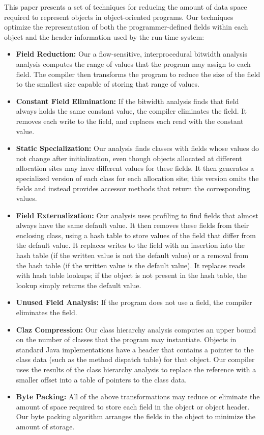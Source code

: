 \documentclass{acmconf}
\begin{document}
This paper presents a set of techniques for reducing the
amount of data space required to represent objects
in object-oriented programs. Our techniques optimize
the representation of both the programmer-defined fields
within each object and the header information used by the
run-time system:
\begin{itemize}
\item {\bf Field Reduction:} 
Our a flow-sensitive, interprocedural bitwidth analysis
analysis computes the range of values that the program
may assign to each field. The compiler then transforms the program
to reduce the size of the field to the smallest size 
capable of storing that range of values. 
\item {\bf Constant Field Elimination:} 
If the bitwidth analysis finds that field always holds
the same constant value, the compiler eliminates the field. 
It removes each write to the field, and replaces each read
with the constant value.
\item {\bf Static Specialization:} Our analysis finds 
classes with fields whose values do not change after initialization,
even though objects allocated at different allocation sites may
have different values for these fields. It then generates 
a specialized version of each class for each allocation site;
this version omits the fields and instead provides accessor
methods that return the corresponding values. 
\item {\bf Field Externalization:} Our analysis uses profiling
to find fields that almost always have the same default value. 
It then removes these fields from their enclosing class, 
using a hash table to store values of the field that differ
from the default value. It replaces writes to the field with
an insertion into the hash table (if the written value is not the
default value) or a removal from the hash table (if the written value
is the default value). It replaces reads with hash table lookups; 
if the object is not present in the hash table, the lookup simply
returns the default value. 
\item {\bf Unused Field Analysis:} If the program does not
use a field, the compiler eliminates the field. 
\item {\bf Claz Compression:} Our class hierarchy analysis
computes an upper bound on the number of classes that the
program may instantiate. Objects in standard 
Java implementations have a header that contains a pointer
to the class data (such as the method dispatch table) for that object. 
Our compiler uses the results of the class
hierarchy analysis to replace the reference with a smaller
offset into a table of pointers to the class data. 
\item {\bf Byte Packing:} All of the above transformations may
reduce or eliminate the amount of space required to store each
field in the object or object header. Our byte packing algorithm
arranges the fields in the object to minimize the amount of 
storage. 
\end{itemize}
\end{document}
